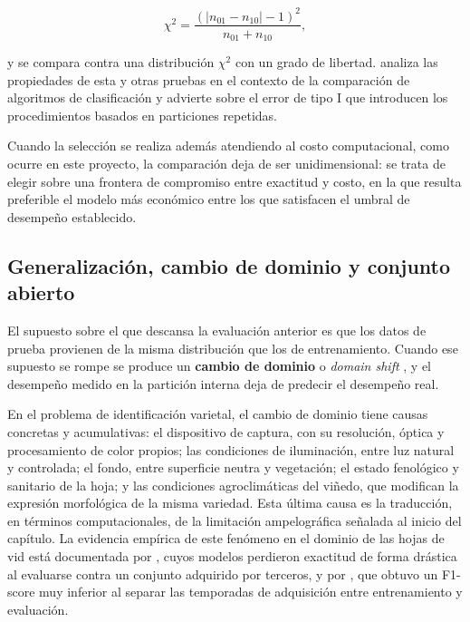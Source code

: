 \begin{equation}
\chi^{2} = \frac{\left(|n_{01} - n_{10}| - 1\right)^{2}}{n_{01} + n_{10}},
\label{eq:mcnemar}
\end{equation}

\noindent y se compara contra una distribución $\chi^{2}$ con un grado de
libertad. \citet{dietterich1998} analiza las propiedades de esta y otras
pruebas en el contexto de la comparación de algoritmos de clasificación y
advierte sobre el error de tipo I que introducen los procedimientos basados
en particiones repetidas.

Cuando la selección se realiza además atendiendo al costo computacional,
como ocurre en este proyecto, la comparación deja de ser unidimensional: se
trata de elegir sobre una frontera de compromiso entre exactitud y costo,
en la que resulta preferible el modelo más económico entre los que
satisfacen el umbral de desempeño establecido.

\subsection{Generalización, cambio de dominio y conjunto abierto}
\label{sec:generalizacion}

El supuesto sobre el que descansa la evaluación anterior es que los datos de
prueba provienen de la misma distribución que los de entrenamiento. Cuando
ese supuesto se rompe se produce un \textbf{cambio de dominio} o
\textit{domain shift} \citep{quinonero2009}, y el desempeño medido en la
partición interna deja de predecir el desempeño real.

En el problema de identificación varietal, el cambio de dominio tiene
causas concretas y acumulativas: el dispositivo de captura, con su
resolución, óptica y procesamiento de color propios; las condiciones de
iluminación, entre luz natural y controlada; el fondo, entre superficie
neutra y vegetación; el estado fenológico y sanitario de la hoja; y las
condiciones agroclimáticas del viñedo, que modifican la expresión
morfológica de la misma variedad. Esta última causa es la traducción, en
términos computacionales, de la limitación ampelográfica señalada al inicio
del capítulo. La evidencia empírica de este fenómeno en el dominio de las
hojas de vid está documentada por \citet{denart2024}, cuyos modelos
perdieron exactitud de forma drástica al evaluarse contra un conjunto
adquirido por terceros, y por \citet{carneiro2024mae}, que obtuvo un
F1-score muy inferior al separar las temporadas de adquisición entre
entrenamiento y evaluación.

